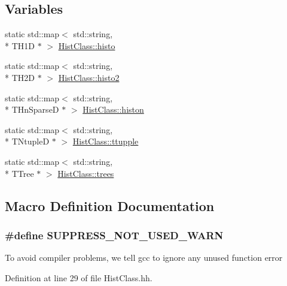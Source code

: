 \subsection*{Variables}
\begin{DoxyCompactItemize}
\item 
static std\-::map$<$ std\-::string, \\*
T\-H1\-D $\ast$ $>$ \hyperlink{namespaceHistClass_aecbf6b504ef1fe080432da67ce20aa61}{Hist\-Class\-::histo}
\item 
static std\-::map$<$ std\-::string, \\*
T\-H2\-D $\ast$ $>$ \hyperlink{namespaceHistClass_afe55352b20fad49b9f1127977f69f0be}{Hist\-Class\-::histo2}
\item 
static std\-::map$<$ std\-::string, \\*
T\-Hn\-Sparse\-D $\ast$ $>$ \hyperlink{namespaceHistClass_a32bc8c292c5e253ad53774e1e667d9e4}{Hist\-Class\-::histon}
\item 
static std\-::map$<$ std\-::string, \\*
T\-Ntuple\-D $\ast$ $>$ \hyperlink{namespaceHistClass_ad55b28aa4052eaf0b5e9bbeba8575f02}{Hist\-Class\-::ttupple}
\item 
static std\-::map$<$ std\-::string, \\*
T\-Tree $\ast$ $>$ \hyperlink{namespaceHistClass_ae4231d725185c3df09776135acb36fce}{Hist\-Class\-::trees}
\end{DoxyCompactItemize}


\subsection{Macro Definition Documentation}
\subsubsection[{S\-U\-P\-P\-R\-E\-S\-S\-\_\-\-N\-O\-T\-\_\-\-U\-S\-E\-D\-\_\-\-W\-A\-R\-N}]{\setlength{\rightskip}{0pt plus 5cm}\#define S\-U\-P\-P\-R\-E\-S\-S\-\_\-\-N\-O\-T\-\_\-\-U\-S\-E\-D\-\_\-\-W\-A\-R\-N}\label{HistClass_8hh_a85edd6ac47f5ea2970c76af20855738c}
To avoid compiler problems, we tell gcc to ignore any unused function error 

Definition at line 29 of file Hist\-Class.\-hh.

